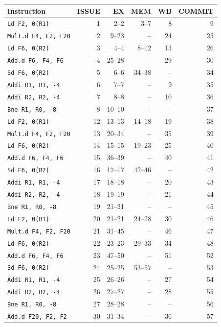 \begin{tabular}{@{}lrrrrr@{}}\toprule
Instruction & ISSUE & EX & MEM & WB & COMMIT\\\midrule
\texttt{Ld F2, 0(R1)} & 1 & 2--2 & 3--7 & 8 & 9 \\
\texttt{Mult.d F4, F2, F20} & 2 & 9--23 & -- & 24 & 25 \\
\texttt{Ld F6, 0(R2)} & 3 & 4--4 & 8--12 & 13 & 26 \\
\texttt{Add.d F6, F4, F6} & 4 & 25--28 & -- & 29 & 30 \\
\texttt{Sd F6, 0(R2)} & 5 & 6--6 & 34--38 & -- & 34 \\
\texttt{Addi R1, R1, -4} & 6 & 7--7 & -- & 9 & 35 \\
\texttt{Addi R2, R2, -4} & 7 & 8--8 & -- & 10 & 36 \\
\texttt{Bne R1, R0, -8} & 8 & 10--10 & -- & -- & 37 \\
\texttt{Ld F2, 0(R1)} & 12 & 13--13 & 14--18 & 19 & 38 \\
\texttt{Mult.d F4, F2, F20} & 13 & 20--34 & -- & 35 & 39 \\
\texttt{Ld F6, 0(R2)} & 14 & 15--15 & 19--23 & 25 & 40 \\
\texttt{Add.d F6, F4, F6} & 15 & 36--39 & -- & 40 & 41 \\
\texttt{Sd F6, 0(R2)} & 16 & 17--17 & 42--46 & -- & 42 \\
\texttt{Addi R1, R1, -4} & 17 & 18--18 & -- & 20 & 43 \\
\texttt{Addi R2, R2, -4} & 18 & 19--19 & -- & 21 & 44 \\
\texttt{Bne R1, R0, -8} & 19 & 21--21 & -- & -- & 45 \\
\texttt{Ld F2, 0(R1)} & 20 & 21--21 & 24--28 & 30 & 46 \\
\texttt{Mult.d F4, F2, F20} & 21 & 31--45 & -- & 46 & 47 \\
\texttt{Ld F6, 0(R2)} & 22 & 23--23 & 29--33 & 34 & 48 \\
\texttt{Add.d F6, F4, F6} & 23 & 47--50 & -- & 51 & 52 \\
\texttt{Sd F6, 0(R2)} & 24 & 25--25 & 53--57 & -- & 53 \\
\texttt{Addi R1, R1, -4} & 25 & 26--26 & -- & 27 & 54 \\
\texttt{Addi R2, R2, -4} & 26 & 27--27 & -- & 28 & 55 \\
\texttt{Bne R1, R0, -8} & 27 & 28--28 & -- & -- & 56 \\
\texttt{Add.d F20, F2, F2} & 30 & 31--34 & -- & 36 & 57 \\
\bottomrule\end{tabular}